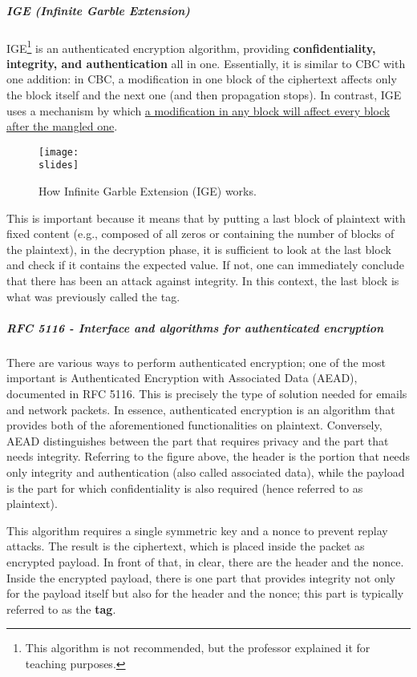 \subparagraph*{IGE (Infinite Garble Extension)}

IGE\footnote{This algorithm is not recommended, but the professor explained it for teaching purposes.} is an authenticated encryption algorithm, providing \textbf{confidentiality, integrity, and authentication} all in one. 
Essentially, it is similar to CBC with one addition: in CBC, a modification in one block of the ciphertext affects only the block itself and the next one (and then propagation stops). In contrast, IGE uses a mechanism by which \ul{a modification in any block will affect every block after the mangled one}.

\begin{figure}[h]
    \centering
    \texttt{[image: \\slides]}
    \caption{How Infinite Garble Extension (IGE) works.}
\end{figure}

This is important because it means that by putting a last block of plaintext with fixed content (e.g., composed of all zeros or containing the number of blocks of the plaintext), in the decryption phase, it is sufficient to look at the last block and check if it contains the expected value. If not, one can immediately conclude that there has been an attack against integrity. In this context, the last block is what was previously called the tag.


\subparagraph*{RFC 5116 - Interface and algorithms for
authenticated encryption}
There are various ways to perform authenticated encryption; one of the most important is Authenticated Encryption with Associated Data (AEAD), documented in RFC 5116. This is precisely the type of solution needed for emails and network packets. In essence, authenticated encryption is an algorithm that provides both of the aforementioned functionalities on plaintext. Conversely, AEAD distinguishes between the part that requires privacy and the part that needs integrity. Referring to the figure above, the header is the portion that needs only integrity and authentication (also called associated data), while the payload is the part for which confidentiality is also required (hence referred to as plaintext).

This algorithm requires a single symmetric key and a nonce to prevent replay attacks. The result is the ciphertext, which is placed inside the packet as encrypted payload. In front of that, in clear, there are the header and the nonce. Inside the encrypted payload, there is one part that provides integrity not only for the payload itself but also for the header and the nonce; this part is typically referred to as the \textbf{tag}.
